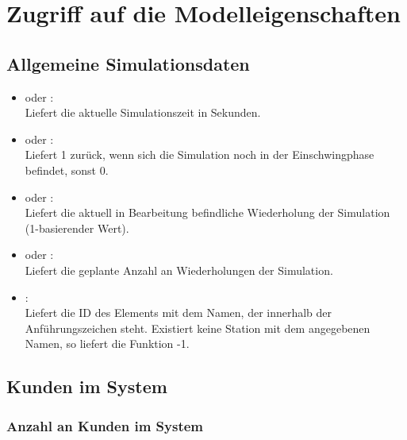 \chapter{Zugriff auf die Modelleigenschaften}



\section{Allgemeine Simulationsdaten}

\begin{itemize}

\item
{} oder :\\
Liefert die aktuelle Simulationszeit in Sekunden.

\item
{} oder :\\
Liefert 1 zurück, wenn sich die Simulation noch in der Einschwingphase befindet, sonst 0.

\item
{} oder :\\
Liefert die aktuell in Bearbeitung befindliche Wiederholung der Simulation (1-basierender Wert).

\item
{} oder :\\
Liefert die geplante Anzahl an Wiederholungen der Simulation.

\item
{}:\\
Liefert die ID des Elements mit dem Namen, der innerhalb der Anführungszeichen steht.
Existiert keine Station mit dem angegebenen Namen, so liefert die Funktion -1.

\end{itemize}





\section{Kunden im System}



\subsection{Anzahl an Kunden im System}


